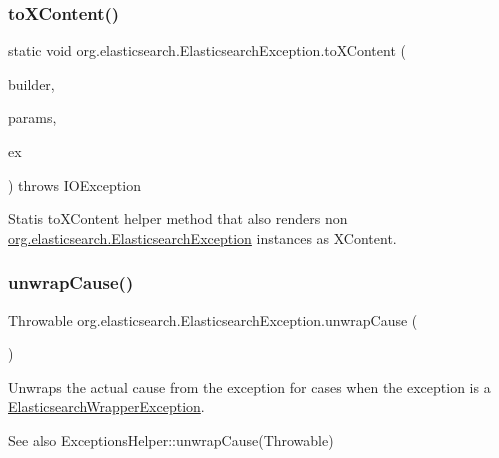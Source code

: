 \subsubsection{\texorpdfstring{to\+X\+Content()}{toXContent()}}
{\footnotesize\ttfamily static void org.\+elasticsearch.\+Elasticsearch\+Exception.\+to\+X\+Content (\begin{DoxyParamCaption}\item[{X\+Content\+Builder}]{builder,  }\item[{Params}]{params,  }\item[{Throwable}]{ex }\end{DoxyParamCaption}) throws I\+O\+Exception\hspace{0.3cm}{\ttfamily [static]}}

Statis to\+X\+Content helper method that also renders non \hyperlink{}{org.\+elasticsearch.\+Elasticsearch\+Exception} instances as X\+Content. \hypertarget{classorg_1_1elasticsearch_1_1_elasticsearch_exception_afc4c4c4644fddfd06805fa19e65459fc}{}\label{classorg_1_1elasticsearch_1_1_elasticsearch_exception_afc4c4c4644fddfd06805fa19e65459fc} 
\subsubsection{\texorpdfstring{unwrap\+Cause()}{unwrapCause()}}
{\footnotesize\ttfamily Throwable org.\+elasticsearch.\+Elasticsearch\+Exception.\+unwrap\+Cause (\begin{DoxyParamCaption}{ }\end{DoxyParamCaption})}

Unwraps the actual cause from the exception for cases when the exception is a \hyperlink{interfaceorg_1_1elasticsearch_1_1_elasticsearch_wrapper_exception}{Elasticsearch\+Wrapper\+Exception}.

\begin{DoxySeeAlso}{See also}
Exceptions\+Helper\+::unwrap\+Cause(\+Throwable) 
\end{DoxySeeAlso}
\hypertarget{classorg_1_1elasticsearch_1_1_elasticsearch_exception_a22de3652428c7858c91a58c7d225a158}{}\label{classorg_1_1elasticsearch_1_1_elasticsearch_exception_a22de3652428c7858c91a58c7d225a158} 
